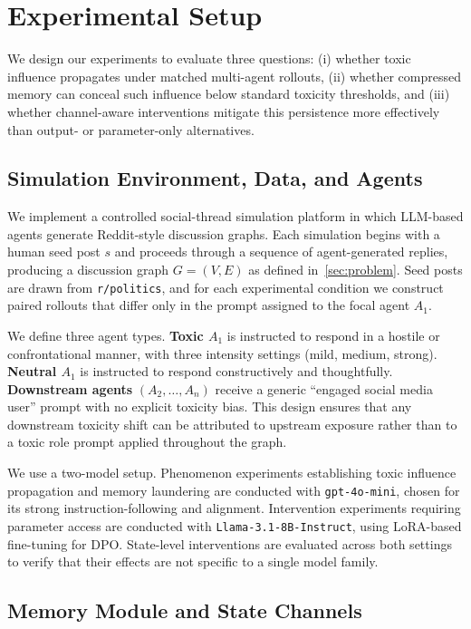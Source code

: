 \section{Experimental Setup}
\label{sec:exp_setup}

We design our experiments to evaluate three questions: (i) whether toxic influence propagates under matched multi-agent rollouts, (ii) whether compressed memory can conceal such influence below standard toxicity thresholds, and (iii) whether channel-aware interventions mitigate this persistence more effectively than output- or parameter-only alternatives.

\subsection{Simulation Environment, Data, and Agents}
\label{sec:sim_env}

We implement a controlled social-thread simulation platform in which LLM-based agents generate Reddit-style discussion graphs. Each simulation begins with a human seed post $s$ and proceeds through a sequence of agent-generated replies, producing a discussion graph $G=(V,E)$ as defined in~\cref{sec:problem}. Seed posts are drawn from \texttt{r/politics}, and for each experimental condition we construct paired rollouts that differ only in the prompt assigned to the focal agent $A_1$.

We define three agent types. \textbf{Toxic $A_1$} is instructed to respond in a hostile or confrontational manner, with three intensity settings (mild, medium, strong). \textbf{Neutral $A_1$} is instructed to respond constructively and thoughtfully. \textbf{Downstream agents} $(A_2,\dots,A_n)$ receive a generic ``engaged social media user'' prompt with no explicit toxicity bias. This design ensures that any downstream toxicity shift can be attributed to upstream exposure rather than to a toxic role prompt applied throughout the graph.

We use a two-model setup. Phenomenon experiments establishing toxic influence propagation and memory laundering are conducted with \texttt{gpt-4o-mini}, chosen for its strong instruction-following and alignment. Intervention experiments requiring parameter access are conducted with \texttt{Llama-3.1-8B-Instruct}, using LoRA-based fine-tuning for DPO. State-level interventions are evaluated across both settings to verify that their effects are not specific to a single model family. 
\subsection{Memory Module and State Channels}
\label{sec:memory_module}

